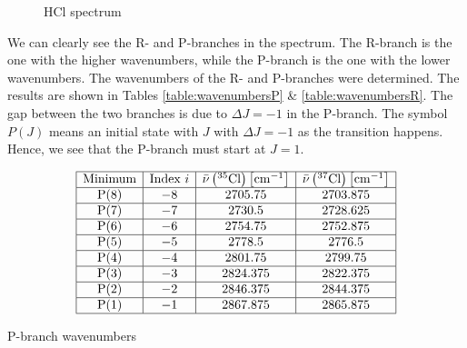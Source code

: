 \documentclass{article}
\begin{document}
\begin{figure}[h!]
	\centering
	\scalebox{0.50}{}
	\caption{HCl spectrum}
	\label{fig:HCl}
\end{figure}

We can clearly see the R- and P-branches in the spectrum. The R-branch is the one with the higher wavenumbers, while the P-branch is the one with the lower wavenumbers. The wavenumbers of the R- and P-branches were determined. The results are shown in Tables \ref{table:wavenumbersP} \& \ref{table:wavenumbersR}. The gap between the two branches is due to $\Delta J = -1$ in the P-branch. The symbol $P(J)$ means an initial state with $J$ with $\Delta J = -1$ as the transition happens. Hence, we see that the P-branch must start at $J = 1$. 

\begin{table}[H]
    \centering
    \[
    \begin{array}{|c|c|c|c|}
    \hline \text{Minimum} & \text{Index } i & \bar{\nu}\left({ }^{35} \mathrm{Cl}\right)\left[\mathrm{cm}^{-1}\right] & \bar{\nu}\left({ }^{37} \mathrm{Cl}\right)\left[\mathrm{cm}^{-1}\right] \\
    \hline \mathrm{P}(8) & -8 & 2705.75 & 2703.875 \\
    \hline \mathrm{P}(7) & -7 & 2730.5 & 2728.625 \\
    \hline \mathrm{P}(6) & -6 & 2754.75 & 2752.875 \\
    \hline \mathrm{P}(5) & -5 & 2778.5 & 2776.5 \\
    \hline \mathrm{P}(4) & -4 & 2801.75 & 2799.75 \\
    \hline \mathrm{P}(3) & -3 & 2824.375 & 2822.375 \\
    \hline \mathrm{P}(2) & -2 & 2846.375 & 2844.375 \\
    \hline \mathrm{P}(1) & -1 & 2867.875 & 2865.875 \\
    \hline
    \end{array}
    \]
    \caption{P-branch wavenumbers}
    \label{table:wavenumbersP}
\end{table}
\end{document}
